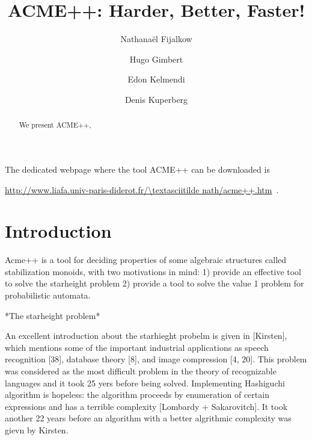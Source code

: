 \documentclass[11pt]{llncs}
\title{ACME++: Harder, Better, Faster!}
\author{Nathana\"el Fijalkow\inst{1,2} \and Hugo Gimbert\inst{3} \and Edon Kelmendi\inst{3} \and Denis Kuperberg\inst{4}}
\institute{LIAFA, Paris 7, France \and University of Warsaw, Poland \and LaBRI, Bordeaux, France \and Onera, Toulouse, France}
\begin{document}
\maketitle
\begin{abstract}
We present ACME++, 
%
\end{abstract}

The dedicated webpage where the tool ACME++ can be downloaded is
\begin{center}
\url{http://www.liafa.univ-paris-diderot.fr/\textasciitilde nath/acme++.htm}\ .
\end{center}

\section{Introduction}

Acme++ is a tool for deciding properties of some algebraic structures called stabilization monoids,
with two motivations in mind:
1) provide an effective tool to solve the starheight problem
2) provide a tool to solve the value 1 problem for probabilistic automata.



*The starheight problem*

An excellent introduction about the starhieght probelm is given in [Kirsten],
which mentions some of the important industrial applications as
speech recognition [38], database theory [8], and image compression [4, 20].
This problem was considered as the most difficult problem in the theory of recognizable languages
and it took 25 yers before being solved.
Implementing Hashiguchi algorithm is hopeless: the algorithm proceeds by enumeration of certain expressions
and has a terrible complexity [Lombardy + Sakarovitch].
It took another 22 years before an algorithm with a better algrithmic complexity was gievn by Kirsten.
\end{document}
